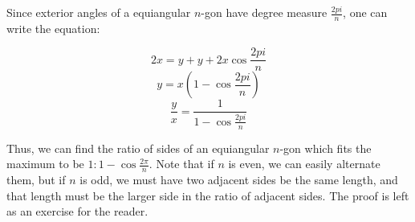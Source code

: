 \begin{enumerate}
 Since exterior angles of a equiangular $n$-gon have degree measure $\frac{2pi}{n}$, one can write the equation:

 
 \[2x = y + y + 2x \cos \frac{2pi}{n}\]
 \[y = x \left( 1- \cos \frac{2pi}{n} \right)\]
 \[\frac{y}{x} = \frac{1}{1- \cos \frac{2pi}{n}}\]

 Thus, we can find the ratio of sides of an equiangular $n$-gon which fits the maximum to be $1 : 1- \cos \frac{2\pi}{n}$. Note that if $n$ is even, we can easily alternate them, but if $n$ is odd, we must have two adjacent sides be the same length, and that length must be the larger side in the ratio  of adjacent sides. The proof is left as an exercise for the reader.

 


\end{enumerate}